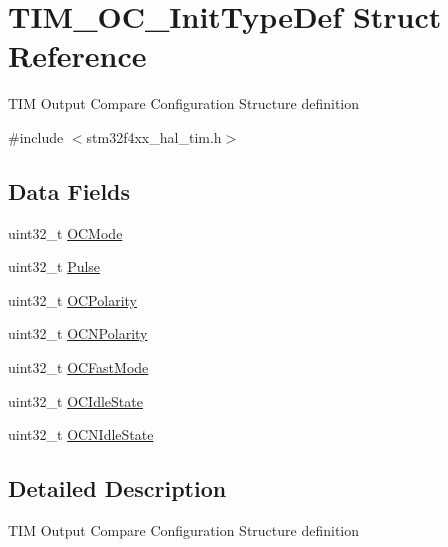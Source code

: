 \hypertarget{struct_t_i_m___o_c___init_type_def}{}\section{T\+I\+M\+\_\+\+O\+C\+\_\+\+Init\+Type\+Def Struct Reference}
\label{struct_t_i_m___o_c___init_type_def}


T\+IM Output Compare Configuration Structure definition ~\newline
  




{\ttfamily \#include $<$stm32f4xx\+\_\+hal\+\_\+tim.\+h$>$}

\subsection*{Data Fields}
\begin{DoxyCompactItemize}
\item 
uint32\+\_\+t \mbox{\hyperlink{struct_t_i_m___o_c___init_type_def_add4ac9143086c89effbede5c54e958bf}{O\+C\+Mode}}
\item 
uint32\+\_\+t \mbox{\hyperlink{struct_t_i_m___o_c___init_type_def_a5251c3bce4ca5baf013bc0ace0865a4c}{Pulse}}
\item 
uint32\+\_\+t \mbox{\hyperlink{struct_t_i_m___o_c___init_type_def_a781c7dae9dec8b6c974b1bdf591b77e7}{O\+C\+Polarity}}
\item 
uint32\+\_\+t \mbox{\hyperlink{struct_t_i_m___o_c___init_type_def_a978da9dd7cda80eb5fe8d04828b9bbcc}{O\+C\+N\+Polarity}}
\item 
uint32\+\_\+t \mbox{\hyperlink{struct_t_i_m___o_c___init_type_def_aadc3d763f52920adcd0150ffbad1043a}{O\+C\+Fast\+Mode}}
\item 
uint32\+\_\+t \mbox{\hyperlink{struct_t_i_m___o_c___init_type_def_a57bb589da3cf2b39b727fe4a3d334ab3}{O\+C\+Idle\+State}}
\item 
uint32\+\_\+t \mbox{\hyperlink{struct_t_i_m___o_c___init_type_def_a78d21970d78c1e3e328692743406ba25}{O\+C\+N\+Idle\+State}}
\end{DoxyCompactItemize}


\subsection{Detailed Description}
T\+IM Output Compare Configuration Structure definition ~\newline
 

